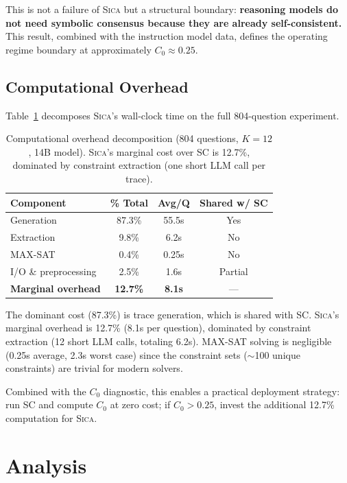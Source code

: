 \documentclass[11pt,a4paper]{article}
\newcommand{\sica}{\textsc{Sica}}
\begin{document}
This is not a failure of \sica{} but a structural boundary: \textbf{reasoning models do not need symbolic consensus because they are already self-consistent.}
This result, combined with the instruction model data, defines the operating regime boundary at approximately $C_0 \approx 0.25$.

\subsection{Computational Overhead}
\label{sec:overhead}

Table~\ref{tab:overhead} decomposes \sica{}'s wall-clock time on the full 804-question experiment.

\begin{table}[t]
\centering
\small
\begin{tabular}{lccc}
\toprule
\textbf{Component} & \textbf{\% Total} & \textbf{Avg/Q} & \textbf{Shared w/ SC} \\
\midrule
Generation & 87.3\% & 55.5s & Yes \\
Extraction & 9.8\% & 6.2s & No \\
MAX-SAT & 0.4\% & 0.25s & No \\
I/O \& preprocessing & 2.5\% & 1.6s & Partial \\
\midrule
\textbf{Marginal overhead} & \textbf{12.7\%} & \textbf{8.1s} & --- \\
\bottomrule
\end{tabular}
\caption{Computational overhead decomposition (804 questions, $K{=}12$, 14B model). \sica{}'s marginal cost over SC is 12.7\%, dominated by constraint extraction (one short LLM call per trace).}
\label{tab:overhead}
\end{table}

The dominant cost (87.3\%) is trace generation, which is shared with SC.
\sica{}'s marginal overhead is 12.7\% (8.1s per question), dominated by constraint extraction (12 short LLM calls, totaling 6.2s).
MAX-SAT solving is negligible (0.25s average, 2.3s worst case) since the constraint sets ($\sim$100 unique constraints) are trivial for modern solvers.

Combined with the $C_0$ diagnostic, this enables a practical deployment strategy: run SC and compute $C_0$ at zero cost; if $C_0 > 0.25$, invest the additional 12.7\% computation for \sica{}.

\section{Analysis}
\label{sec:analysis}
\end{document}
